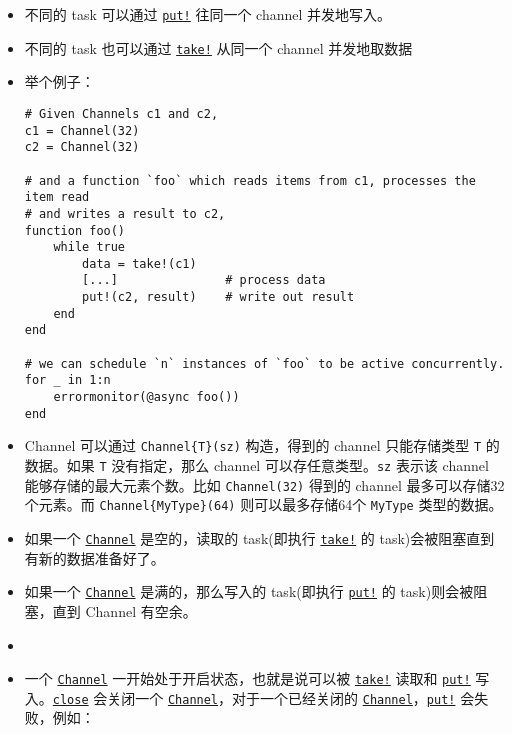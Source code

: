 \begin{itemize}
\item 不同的 task 可以通过 \hyperlink{10812715779190652189}{\texttt{put!}} 往同一个 channel 并发地写入。


\item 不同的 task 也可以通过 \hyperlink{4963355246106153560}{\texttt{take!}} 从同一个 channel 并发地取数据


\item 举个例子：


\begin{verbatim}
# Given Channels c1 and c2,
c1 = Channel(32)
c2 = Channel(32)

# and a function `foo` which reads items from c1, processes the item read
# and writes a result to c2,
function foo()
    while true
        data = take!(c1)
        [...]               # process data
        put!(c2, result)    # write out result
    end
end

# we can schedule `n` instances of `foo` to be active concurrently.
for _ in 1:n
    errormonitor(@async foo())
end
\end{verbatim}


\item Channel 可以通过 \texttt{Channel\{T\}(sz)} 构造，得到的 channel 只能存储类型 \texttt{T} 的数据。如果 \texttt{T} 没有指定，那么 channel 可以存任意类型。\texttt{sz} 表示该 channel 能够存储的最大元素个数。比如 \texttt{Channel(32)} 得到的 channel 最多可以存储32个元素。而 \texttt{Channel\{MyType\}(64)} 则可以最多存储64个 \texttt{MyType} 类型的数据。


\item 如果一个 \hyperlink{12548845729684045604}{\texttt{Channel}} 是空的，读取的 task(即执行 \hyperlink{4963355246106153560}{\texttt{take!}} 的 task)会被阻塞直到有新的数据准备好了。


\item 如果一个 \hyperlink{12548845729684045604}{\texttt{Channel}} 是满的，那么写入的 task(即执行 \hyperlink{10812715779190652189}{\texttt{put!}} 的 task)则会被阻塞，直到 Channel 有空余。


\item
\item 一个 \hyperlink{12548845729684045604}{\texttt{Channel}} 一开始处于开启状态，也就是说可以被 \hyperlink{4963355246106153560}{\texttt{take!}} 读取和 \hyperlink{10812715779190652189}{\texttt{put!}} 写入。\hyperlink{5331333469799487255}{\texttt{close}} 会关闭一个 \hyperlink{12548845729684045604}{\texttt{Channel}}，对于一个已经关闭的 \hyperlink{12548845729684045604}{\texttt{Channel}}，\hyperlink{10812715779190652189}{\texttt{put!}} 会失败，例如：



\end{itemize}
